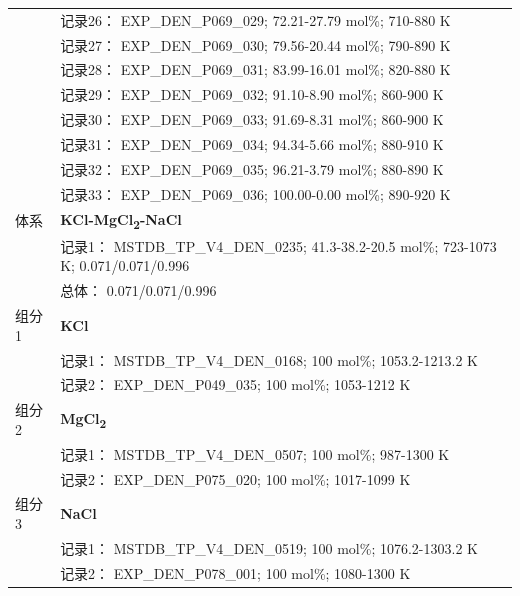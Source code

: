 \documentclass[12pt]{article}
\begin{document}
{\begin{longtable}[]{@{}
  >{\raggedright\arraybackslash}p{}
  >{\raggedright\arraybackslash}p{}@{}}
 & 记录26： EXP\_DEN\_P069\_029; 72.21-27.79 mol\%; 710-880 K \\
 & 记录27： EXP\_DEN\_P069\_030; 79.56-20.44 mol\%; 790-890 K \\
 & 记录28： EXP\_DEN\_P069\_031; 83.99-16.01 mol\%; 820-880 K \\
 & 记录29： EXP\_DEN\_P069\_032; 91.10-8.90 mol\%; 860-900 K \\
 & 记录30： EXP\_DEN\_P069\_033; 91.69-8.31 mol\%; 860-900 K \\
 & 记录31： EXP\_DEN\_P069\_034; 94.34-5.66 mol\%; 880-910 K \\
 & 记录32： EXP\_DEN\_P069\_035; 96.21-3.79 mol\%; 880-890 K \\
 & 记录33： EXP\_DEN\_P069\_036; 100.00-0.00 mol\%; 890-920 K  \\

\midrule
体系 & \textbf{KCl-MgCl\textsubscript{2}-NaCl} \\
 & 记录1： MSTDB\_TP\_V4\_DEN\_0235; 41.3-38.2-20.5 mol\%; 723-1073 K; 0.071/0.071/0.996 \\
 & 总体： 0.071/0.071/0.996  \\

组分 1  & \textbf{KCl} \\
 & 记录1： MSTDB\_TP\_V4\_DEN\_0168; 100 mol\%; 1053.2-1213.2 K \\
 & 记录2： EXP\_DEN\_P049\_035; 100 mol\%; 1053-1212 K  \\

组分 2  & \textbf{MgCl\textsubscript{2}} \\
 & 记录1： MSTDB\_TP\_V4\_DEN\_0507; 100 mol\%; 987-1300 K \\
 & 记录2： EXP\_DEN\_P075\_020; 100 mol\%; 1017-1099 K  \\

组分 3  & \textbf{NaCl} \\
 & 记录1： MSTDB\_TP\_V4\_DEN\_0519; 100 mol\%; 1076.2-1303.2 K \\
 & 记录2： EXP\_DEN\_P078\_001; 100 mol\%; 1080-1300 K  \\


\end{longtable}}
\end{document}
